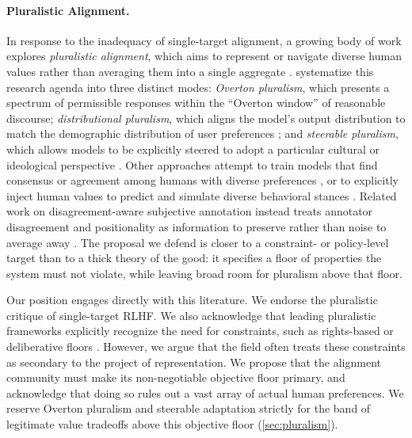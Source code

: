 \documentclass{article}
\theoremstyle{plain}
\theoremstyle{definition}
\theoremstyle{remark}
\begin{document}
\paragraph{Pluralistic Alignment.}
In response to the inadequacy of single-target alignment, a growing body of work explores \emph{pluralistic alignment}, which aims to represent or navigate diverse human values rather than averaging them into a single aggregate \citep{gabriel2020artificial, conitzer2024social, wan2023everyone, li2026pluriharms}. \citet{sorensen2024roadmap} systematize this research agenda into three distinct modes: \emph{Overton pluralism}, which presents a spectrum of permissible responses within the ``Overton window'' of reasonable discourse; \emph{distributional pluralism}, which aligns the model's output distribution to match the demographic distribution of user preferences \citep{wan2023everyone, cheng-etal-2025-realm}; and \emph{steerable pluralism}, which allows models to be explicitly steered to adopt a particular cultural or ideological perspective \citep{ghate2025evaluesteer}. Other approaches attempt to train models that find consensus or agreement among humans with diverse preferences \citep{bakker2022fine}, or to explicitly inject human values to predict and simulate diverse behavioral stances \citep{kang-etal-2023-values}. Related work on disagreement-aware subjective annotation instead treats annotator disagreement and positionality as information to preserve rather than noise to average away \citep{wan2025noise}.
 The proposal we defend is closer to a constraint- or policy-level target than to a thick theory of the good: it specifies a floor of properties the system must not violate, while leaving broad room for pluralism above that floor.

Our position engages directly with this literature. We endorse the pluralistic critique of single-target RLHF. We also acknowledge that leading pluralistic frameworks explicitly recognize the need for constraints, such as rights-based or deliberative floors \citep{gabriel2020artificial, kasirzadeh2023conversation, sorensen2024roadmap}. However, we argue that the field often treats these constraints as secondary to the project of representation. We propose that the alignment community must make its non-negotiable objective floor primary, and acknowledge that doing so rules out a vast array of actual human preferences. We reserve Overton pluralism and steerable adaptation strictly for the band of legitimate value tradeoffs above this objective floor (\cref{sec:pluralism}).
\end{document}
